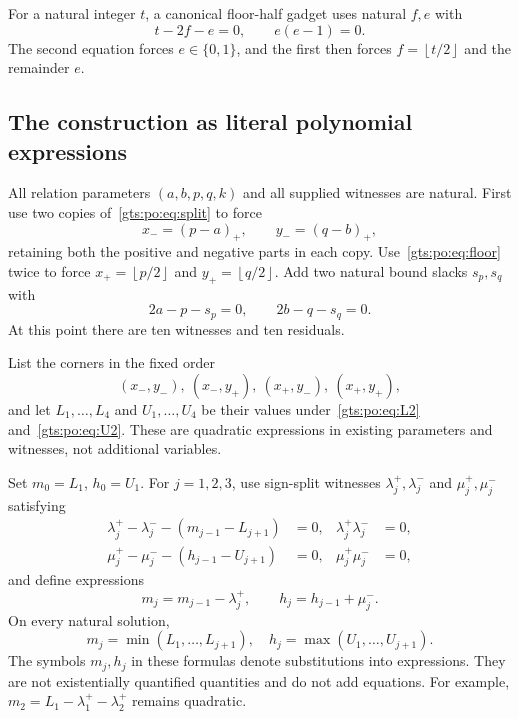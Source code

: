 \documentclass[11pt,letterpaper]{article}
\theoremstyle{definition}
\theoremstyle{remark}
\newcommand{\pos}[1]{(#1)_{+}}
\newcommand{\floor}[1]{\left\lfloor #1\right\rfloor}
\begin{document}
For a natural integer $t$, a canonical floor-half gadget uses natural $f,e$ with
\begin{equation}\label{gts:po:eq:floor}
 t-2f-e=0,\qquad e(e-1)=0.
\end{equation}
The second equation forces $e\in\{0,1\}$, and the first then forces $f=\floor{t/2}$ and the remainder $e$.

\subsection{The construction as literal polynomial expressions}
All relation parameters $(a,b,p,q,k)$ and all supplied witnesses are natural. First use two copies of~\eqref{gts:po:eq:split} to force
\[
 x_-=\pos{p-a},\qquad y_-=\pos{q-b},
\]
retaining both the positive and negative parts in each copy. Use~\eqref{gts:po:eq:floor} twice to force $x_+=\floor{p/2}$ and $y_+=\floor{q/2}$. Add two natural bound slacks $s_p,s_q$ with
\begin{equation}\label{gts:po:eq:boundslacks}
 2a-p-s_p=0,\qquad 2b-q-s_q=0.
\end{equation}
At this point there are ten witnesses and ten residuals.

List the corners in the fixed order
\[
 (x_-,y_-),\ (x_-,y_+),\ (x_+,y_-),\ (x_+,y_+),
\]
and let $L_1,\ldots,L_4$ and $U_1,\ldots,U_4$ be their values under~\eqref{gts:po:eq:L2} and~\eqref{gts:po:eq:U2}. These are quadratic expressions in existing parameters and witnesses, not additional variables.

Set $m_0=L_1$, $h_0=U_1$. For $j=1,2,3$, use sign-split witnesses $\lambda_j^+,\lambda_j^-$ and $\mu_j^+,\mu_j^-$ satisfying
\begin{align}
 \lambda_j^+-\lambda_j^--(m_{j-1}-L_{j+1})&=0,
 &\lambda_j^+\lambda_j^-&=0,\label{gts:po:eq:minsplit}\\
 \mu_j^+-\mu_j^--(h_{j-1}-U_{j+1})&=0,
 &\mu_j^+\mu_j^-&=0,\label{gts:po:eq:maxsplit}
\end{align}
and define expressions
\begin{equation}\label{gts:po:eq:minmaxexpr}
 m_j=m_{j-1}-\lambda_j^+,
 \qquad h_j=h_{j-1}+\mu_j^-.
\end{equation}
On every natural solution,
\[
 m_j=\min(L_1,\ldots,L_{j+1}),\quad
 h_j=\max(U_1,\ldots,U_{j+1}).
\]
The symbols $m_j,h_j$ in these formulas denote substitutions into expressions. They are not existentially quantified quantities and do not add equations. For example, $m_2=L_1-\lambda_1^+-\lambda_2^+$ remains quadratic.
\end{document}
